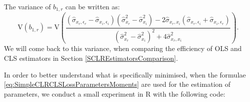 \documentclass[
]{book}
\begin{document}
The variance of \(b_{1,r}\) can be written as:
\begin{equation}
    \mathrm{V}(b_{1,r}) = \mathrm{V}\left(\frac{\left(\hat{\sigma}_{x_r, \epsilon_r} - \hat{\sigma}_{x_i, \epsilon_i}\right) \left(\hat{\sigma}_{x_r}^2 - \hat{\sigma}_{x_i}^2 \right) - 2 \hat{\sigma}_{x_r, x_i} \left(\hat{\sigma}_{x_r, \epsilon_i} + \hat{\sigma}_{x_i, \epsilon_r}\right)}{\left(\hat{\sigma}_{x_r}^2 - \hat{\sigma}_{x_i}^2\right)^2 + 4 \hat{\sigma}_{x_r, x_i}^2}\right) .
    \label{eq:SimpleCLRCLSb1Variance}
\end{equation}
We will come back to this variance, when comparing the efficiency of OLS and CLS estimators in Section \ref{SCLREstimatorsComparison}.

In order to better understand what is specifically minimised, when the formulae \eqref{eq:SimpleCLRCLSLossParametersMoments} are used for the estimation of parameters, we conduct a small experiment in R with the following code:
\end{document}
